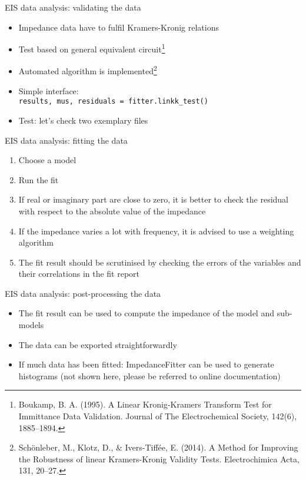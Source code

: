 \documentclass[11pt]{beamer}
\begin{document}
\begin{frame}{EIS data analysis: validating the data}
\begin{itemize}
\item Impedance data have to fulfil Kramers-Kronig relations
\item Test based on general equivalent circuit\footnote{\tiny Boukamp, B. A. (1995). A Linear Kronig‐Kramers Transform Test for Immittance Data Validation. Journal of The Electrochemical Society, 142(6), 1885–1894.}
\item Automated algorithm is implemented\footnote{\tiny Schönleber, M., Klotz, D., \& Ivers-Tiffée, E. (2014). A Method for Improving the Robustness of linear Kramers-Kronig Validity Tests. Electrochimica Acta, 131, 20–27.}
\item Simple interface:\\
\lstinline{results, mus, residuals = fitter.linkk_test()}
\item Test: let's check two exemplary files
\end{itemize}
\end{frame}

\begin{frame}{EIS data analysis: fitting the data}
\begin{enumerate}
\item Choose a model 
\item Run the fit
\item If real or imaginary part are close to zero, it is better to check the residual with respect to the absolute value of the impedance
\item If the impedance varies a lot with frequency, it is advised to use a weighting algorithm
\item The fit result should be scrutinised by checking the errors of the variables and their correlations in the fit report
\end{enumerate}
\end{frame}

\begin{frame}{EIS data analysis: post-processing the data}
\begin{itemize}
\item The fit result can be used to compute the impedance of the model and sub-models
\item The data can be exported straightforwardly
\item If much data has been fitted: ImpedanceFitter can be used to generate histograms  (not shown here, please be referred to online documentation)
\end{itemize}
\end{frame}
\end{document}
